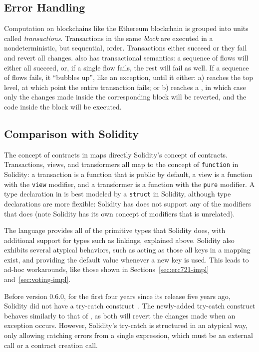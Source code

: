 \documentclass[dvipsnames, usenames, sigconf]{acmart}
\begin{document}
\subsection{Error Handling}
Computation on blockchains like the Ethereum blockchain is grouped into units called \emph{transactions}.
Transactions in the same \emph{block} are executed in a nondeterministic, but sequential, order.
Transactions either succeed or they fail and revert all changes.
\langName also has transactional semantics: a sequence of flows will either all succeed, or, if a single flow fails, the rest will fail as well.
If a sequence of flows fails, it ``bubbles up'', like an exception, until it either: a) reaches the top level, at which point the entire transaction fails; or b) reaches a , in which case only the changes made inside the corresponding  block will be reverted, and the code inside the  block will be executed.

\subsection{Comparison with Solidity}
The concept of contracts in \langName maps directly Solidity's concept of contracts.
Transactions, views, and transformers all map to the concept of \lstinline{function} in Solidity: a transaction is a function that is public by default, a view is a function with the \lstinline{view} modifier, and a transformer is a function with the \lstinline{pure} modifier.
A type declaration in \langName is best modeled by a \lstinline{struct} in Solidity, although type declarations are more flexible: Solidity has does not support any of the modifiers that \langName does (note Solidity has its own concept of modifiers that is unrelated).

The \langName language provides all of the primitive types that Solidity does, with additional support for types such as linkings, explained above.
Solidity also exhibits several atypical behaviors, such as acting as those all keys in a mapping exist, and providing the default value whenever a new key is used.
This leads to ad-hoc workarounds, like those shown in Sections~\ref{sec:erc721-impl} and~\ref{sec:voting-impl}.

Before version 0.6.0, for the first four years since its release five years ago, Solidity did not have a try-catch construct~\cite{SolidityTryCatch}.
The newly-added try-catch construct behaves similarly to that of \langName, as both will revert the changes made when an exception occurs.
However, Solidity's try-catch is structured in an atypical way, only allowing catching errors from a single expression, which must be an external call or a contract creation call.
\end{document}
